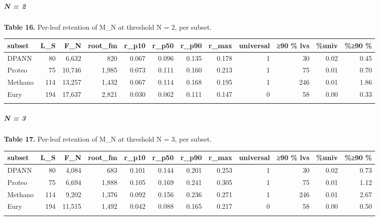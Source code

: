 \documentclass[
  10pt,
]{article}
\begin{document}
\subparagraph{N = 2}\label{n--2}

\textbf{Table 16.} Per-leaf retention of M\_N at threshold N = 2, per
subset.

\begin{center}
\begin{adjustbox}{max width=\textwidth}
\begin{tabular}{@{}lrrrrrrrrrrr@{}}
\toprule\noalign{}
subset & L\_S & F\_N & root\_fm & r\_p10 & r\_p50 & r\_p90 & r\_max &
universal & ≥90 \% lvs & \%univ & \%≥90 \% \\
\midrule\noalign{}
DPANN & 80 & 6,632 & 820 & 0.067 & 0.096 & 0.135 & 0.178 & 1 & 30 & 0.02
& 0.45 \\
Proteo & 75 & 10,746 & 1,985 & 0.073 & 0.111 & 0.160 & 0.213 & 1 & 75 &
0.01 & 0.70 \\
Methano & 114 & 13,257 & 1,432 & 0.067 & 0.114 & 0.168 & 0.195 & 1 & 246
& 0.01 & 1.86 \\
Eury & 194 & 17,637 & 2,821 & 0.030 & 0.062 & 0.111 & 0.147 & 0 & 58 &
0.00 & 0.33 \\
\bottomrule\noalign{}
\end{tabular}
\end{adjustbox}
\end{center}

\subparagraph{N = 3}\label{n--3}

\textbf{Table 17.} Per-leaf retention of M\_N at threshold N = 3, per
subset.

\begin{center}
\begin{adjustbox}{max width=\textwidth}
\begin{tabular}{@{}lrrrrrrrrrrr@{}}
\toprule\noalign{}
subset & L\_S & F\_N & root\_fm & r\_p10 & r\_p50 & r\_p90 & r\_max &
universal & ≥90 \% lvs & \%univ & \%≥90 \% \\
\midrule\noalign{}
DPANN & 80 & 4,084 & 683 & 0.101 & 0.144 & 0.201 & 0.253 & 1 & 30 & 0.02
& 0.73 \\
Proteo & 75 & 6,694 & 1,888 & 0.105 & 0.169 & 0.241 & 0.305 & 1 & 75 &
0.01 & 1.12 \\
Methano & 114 & 9,202 & 1,376 & 0.092 & 0.156 & 0.236 & 0.271 & 1 & 246
& 0.01 & 2.67 \\
Eury & 194 & 11,515 & 1,492 & 0.042 & 0.088 & 0.165 & 0.217 & 0 & 58 &
0.00 & 0.50 \\
\bottomrule\noalign{}
\end{tabular}
\end{adjustbox}
\end{center}
\end{document}
